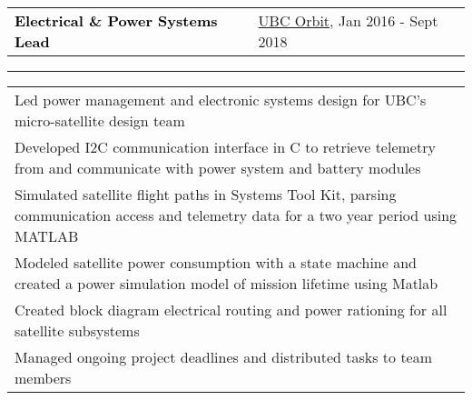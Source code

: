 \documentclass[10pt,letterpaper]{article}
\newcommand{\mpwidth}{\linewidth-\fboxsep-\fboxsep}
\newcommand{\tzlarrow}{(0,0) -- (0.2,0) -- (0.3,0.2) -- (0.2,0.4) -- (0,0.4) -- (0.1,0.2) -- cycle;}
\newcommand{\larrow}[1]
{\begin{tikzpicture}[scale=0.58]
	 \filldraw[fill=#1!100,draw=#1!100!black]  \tzlarrow
 \end{tikzpicture}
}
\newcommand{\cvsection}[1]
{
\colorbox{sectcol}{\mystrut \makebox[1\mpwidth][l]{
\textcolor{white}{\uppercase{#1}}}}\\
}
\newcommand{\cvbigevent}[9]
{
\vspace{8pt}
	\begin{tabular*}{0.2\mpwidth}{p{0.4\mpwidth}  x{0.575\mpwidth}}
 	\textcolor{black}{\textbf{#2}} & \textcolor{complcol}{#3}, \textcolor{bgcol}{#1} 

	\end{tabular*}
\vspace{-12pt}
\textcolor{softcol}{\hrule}
\vspace{6pt}
	\begin{tabular*}{0.5\mpwidth}{p{\mpwidth}}
\larrow{softcol}  #4\\[6pt]
\larrow{softcol}  #5\\[6pt]
\larrow{softcol}  #6\\[6pt]
\larrow{softcol}  #7\\[6pt]
\larrow{softcol}  #8\\[6pt]
\larrow{softcol}  #9\\[6pt]
	\end{tabular*}

}
\newcommand{\mystrut}{\rule[-.3\baselineskip]{0pt}{\baselineskip}}
\begin{document}
{\begin{minipage}[c][0.95\textheight][t]{0.69\linewidth}






\vspace{12pt}


\cvsection{Design Team}


\cvbigevent{Jan 2016 - Sept 2018}{Electrical \& Power Systems Lead}{\href{https://www.ubcorbit.com/}{UBC Orbit}}{Led power management and electronic systems design for UBC's micro-satellite design team}{Developed I2C communication interface in C to retrieve telemetry from and communicate with power system and battery modules}{Simulated satellite flight paths in Systems Tool Kit, parsing communication access and telemetry data for a two year period using MATLAB}{Modeled satellite power consumption with a state machine and created a power simulation model of mission lifetime using Matlab}{Created block diagram electrical routing and power rationing for all satellite subsystems}{Managed ongoing project deadlines and distributed tasks to team members}






\end{minipage}}%
\end{document}
